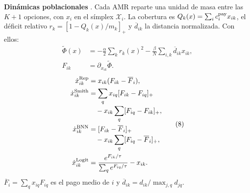 \begin{minipage}[t]{.49\linewidth}
\textbf{Dinámicas poblacionales}
\citep{sandholm2010population,quijano2017population}.
Cada AMR reparte una unidad de masa entre las $K+1$ opciones, con $x_i$ en el
símplex $\mathcal X_i$. La cobertura es $Q_k(x)=\sum_ic_i^{\rm pay}x_{ik}$, el
déficit relativo $r_k=[1-Q_k(x)/m_k]_+$ y $\overline{d}_{ik}$ la distancia
normalizada. Con ellos:
\begin{equation}
\begin{aligned}
\label{eq:n4-fii-potential}
\widetilde\Phi(x)&=-\frac{\alpha}{2}\sum_kr_k(x)^2
-\frac{\beta}{N}\sum_{i,k}\overline{d}_{ik}x_{ik},\\[-1mm]
F_{ik}&=\partial_{x_{ik}}\widetilde\Phi .
\end{aligned}
\tag{7}
\end{equation}
\begin{equation}
\begin{aligned}
\dot x_{ik}^{\rm Rep}&=x_{ik}(F_{ik}-\overline{F}_i),\\
\dot x_{ik}^{\rm Smith}&=\sum_qx_{iq}[F_{ik}-F_{iq}]_+
\\[-1mm]&\quad-x_{ik}\sum_q[F_{iq}-F_{ik}]_+,\\
\dot x_{ik}^{\rm BNN}&=[F_{ik}-\overline{F}_i]_+
\\[-1mm]&\quad-x_{ik}\sum_q[F_{iq}-\overline{F}_i]_+,\\
\dot x_{ik}^{\rm Logit}&=
\frac{e^{F_{ik}/\tau}}{\sum_qe^{F_{iq}/\tau}}-x_{ik}.
\end{aligned}
\tag{8}
\end{equation}
$\overline{F}_i=\sum_qx_{iq}F_{iq}$ es el pago medio de $i$ y $\overline{d}_{ik}=d_{ik}/\max_{j,q}d_{jq}$.
\end{minipage}\hfill
